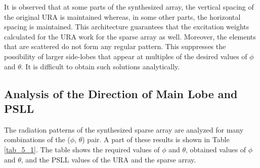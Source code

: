 It is observed that at some parts of the synthesized array, the vertical spacing of the original URA is maintained whereas, in some other parts, the horizontal spacing is maintained. This architecture guarantees that the excitation weights calculated for the URA work for the sparse array as well. Moreover, the elements that are scattered do not form any regular pattern. This suppresses the possibility of larger side-lobes that appear at multiples of the desired values of $\phi$ and $\theta$. It is difficult to obtain such solutions analytically.

\subsection{Analysis of the Direction of Main Lobe and PSLL}
The radiation patterns of the synthesized sparse array are analyzed for many combinations of the ($\phi$, $\theta$) pair. A part of these results is shown in Table \ref{tab_5_1}. The table shows the required values of $\phi$ and $\theta$, obtained values of $\phi$ and $\theta$, and the PSLL values of the URA and the sparse array.

\begin{table}[]
\caption{Some of the angles considered} \label{tab_5_1}
\centering
{}
\end{table}

